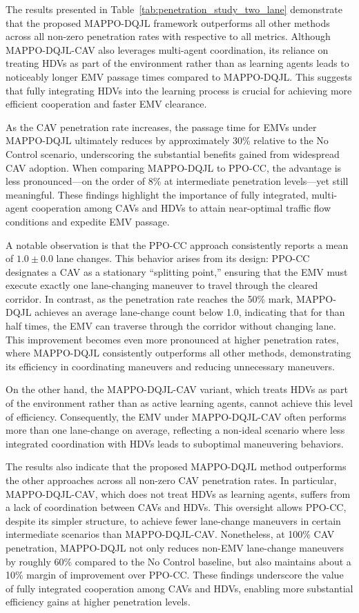 The results presented in Table~\ref{tab:penetration_study_two_lane} demonstrate that the proposed MAPPO-DQJL framework outperforms all other methods across all non-zero penetration rates with respective to all metrics. Although MAPPO-DQJL-CAV also leverages multi-agent coordination, its reliance on treating HDVs as part of the environment rather than as learning agents leads to noticeably longer EMV passage times compared to MAPPO-DQJL. This suggests that fully integrating HDVs into the learning process is crucial for achieving more efficient cooperation and faster EMV clearance.

As the CAV penetration rate increases, the passage time for EMVs under MAPPO-DQJL ultimately reduces by approximately 30\% relative to the No Control scenario, underscoring the substantial benefits gained from widespread CAV adoption. When comparing MAPPO-DQJL to PPO-CC, the advantage is less pronounced—on the order of 8\% at intermediate penetration levels—yet still meaningful. These findings highlight the importance of fully integrated, multi-agent cooperation among CAVs and HDVs to attain near-optimal traffic flow conditions and expedite EMV passage.

A notable observation is that the PPO-CC approach consistently reports a mean of $1.0 \pm 0.0$ lane changes. This behavior arises from its design: PPO-CC designates a CAV as a stationary “splitting point,” ensuring that the EMV must execute exactly one lane-changing maneuver to travel through the cleared corridor. In contrast, as the penetration rate reaches the 50\% mark, MAPPO-DQJL achieves an average lane-change count below 1.0, indicating that for than half times, the EMV can traverse through the corridor without changing lane. This improvement becomes even more pronounced at higher penetration rates, where MAPPO-DQJL consistently outperforms all other methods, demonstrating its efficiency in coordinating maneuvers and reducing unnecessary maneuvers.

On the other hand, the MAPPO-DQJL-CAV variant, which treats HDVs as part of the environment rather than as active learning agents, cannot achieve this level of efficiency. Consequently, the EMV under MAPPO-DQJL-CAV often performs more than one lane-change on average, reflecting a non-ideal scenario where less integrated coordination with HDVs leads to suboptimal maneuvering behaviors.

The results also indicate that the proposed MAPPO-DQJL method outperforms the other approaches across all non-zero CAV penetration rates. In particular, MAPPO-DQJL-CAV, which does not treat HDVs as learning agents, suffers from a lack of coordination between CAVs and HDVs. This oversight allows PPO-CC, despite its simpler structure, to achieve fewer lane-change maneuvers in certain intermediate scenarios than MAPPO-DQJL-CAV. Nonetheless, at 100\% CAV penetration, MAPPO-DQJL not only reduces non-EMV lane-change maneuvers by roughly 60\% compared to the No Control baseline, but also maintains about a 10\% margin of improvement over PPO-CC. These findings underscore the value of fully integrated cooperation among CAVs and HDVs, enabling more substantial efficiency gains at higher penetration levels.

